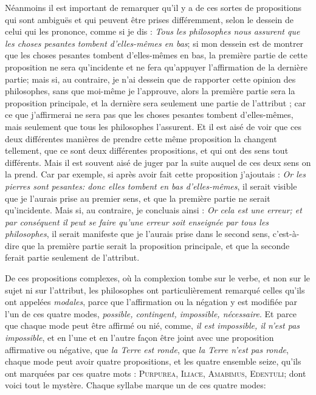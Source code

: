 Néanmoins il est important de remarquer qu'il y a de ces sortes de propositions qui sont ambiguës et qui peuvent être prises différemment, selon le dessein de celui qui les prononce, comme si je dis : \emph{Tous les philosophes nous assurent que les choses pesantes tombent d'elles-mêmes en bas}; si mon dessein est de montrer que les choses pesantes tombent d'elles-mêmes en bas, la première partie de cette proposition ne sera qu'incidente et ne fera qu'appuyer l'affirmation de la dernière partie; mais si, au contraire, je n'ai dessein que de rapporter cette opinion des philosophes, sans que moi-même je l'approuve, alors la première partie sera la proposition principale, et la dernière sera seulement une partie de l'attribut ; car ce que j'affirmerai ne sera pas que les choses pesantes tombent d'elles-mêmes, mais seulement que tous les philosophes l'assurent. Et il est aisé de voir que ces deux différentes manières de prendre cette même proposition la changent tellement, que ce sont deux différentes propositions, et qui ont des sens tout différents. Mais il est souvent aisé de juger par la suite auquel de ces deux sens on la prend. Car par exemple, si après avoir fait cette proposition j'ajoutais : \emph{Or les pierres sont pesantes: donc elles tombent en bas d'elles-mêmes}, il serait visible que je l'aurais prise au premier sens, et que la première partie ne serait qu'incidente. Mais si, au contraire, je concluais ainsi : \emph{Or cela est une erreur; et par conséquent il peut se faire qu'une erreur soit enseignée par tous les philosophes}, il serait manifeste que je l'aurais prise dans le second sens, c'est-à-dire que la première partie serait la proposition principale, et que la seconde ferait partie seulement de l'attribut.

De ces propositions complexes, où la complexion tombe sur le verbe, et non sur le sujet ni sur l'attribut, les philosophes ont particulièrement remarqué celles qu'ils ont appelées \emph{modales}, parce que l'affirmation ou la négation y est modifiée par l'un de ces quatre modes, \emph{possible, contingent, impossible, nécessaire}. Et parce que chaque mode peut être affirmé ou nié, comme, \emph{il est impossible, il n'est pas impossible}, et en l'une et en l'autre façon être joint avec une proposition affirmative ou négative, que \emph{la Terre est ronde}, que \emph{la Terre n'est pas ronde}, chaque mode peut avoir quatre propositions, et les quatre ensemble seize, qu'ils ont marquées par ces quatre mots : {\scshape Purpurea}, {\scshape Iliace}, {\scshape Amabimus}, {\scshape Edentuli}; dont voici tout le mystère. Chaque syllabe marque un de ces quatre modes:

